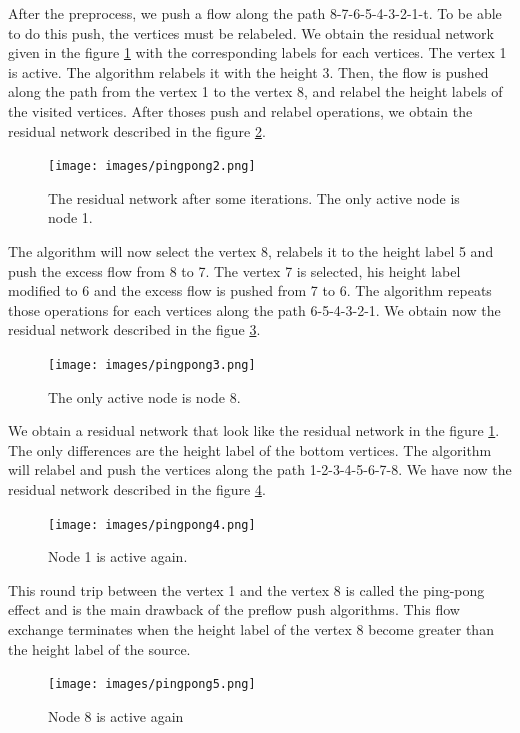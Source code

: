 After the preprocess, we push a flow along the path 8-7-6-5-4-3-2-1-t. To be able to do this push, the vertices must be relabeled. We obtain the residual network given in the figure \ref{img:pingpong2} with the corresponding labels for each vertices. The vertex 1 is active. The algorithm relabels it with the height 3. Then, the flow is pushed along the path from the vertex 1 to the vertex 8, and relabel the height labels of the visited vertices. After thoses push and relabel operations, we obtain the residual network described in the figure \ref{img:pingpong3}.

\begin{figure}[H]
\centering
\texttt{[image: images/pingpong2.png]}
\caption{The residual network after some iterations. The only active node is node 1.}
\label{img:pingpong2}
\end{figure}

The algorithm will now select the vertex 8, relabels it to the height label 5 and push the excess flow from 8 to 7. The vertex 7 is selected, his height label modified to 6 and the excess flow is pushed from 7 to 6. The algorithm repeats those operations for each vertices along the path 6-5-4-3-2-1. We obtain now the residual network described in the figue \ref{img:pingpong4}.

\begin{figure}[H]
\centering
\texttt{[image: images/pingpong3.png]}
\caption{The only active node is node 8.}
\label{img:pingpong3}
\end{figure}

We obtain a residual network that look like the residual network in the figure \ref{img:pingpong2}. The only differences are the height label of the bottom vertices. The algorithm will relabel and push the vertices along the path 1-2-3-4-5-6-7-8. We have now the residual network described in the figure \ref{img:pingpong5}.
\begin{figure}[H]
\centering
\texttt{[image: images/pingpong4.png]}
\caption{Node 1 is active again.}
\label{img:pingpong4}
\end{figure}

This round trip between the vertex 1 and the vertex 8 is called the ping-pong effect and is the main drawback of the preflow push algorithms. This flow exchange terminates when the height label of the vertex 8 become greater than the height label of the source.


\begin{figure}[H]
\centering
\texttt{[image: images/pingpong5.png]}
\caption{Node 8 is active again}
\label{img:pingpong5}
\end{figure}
